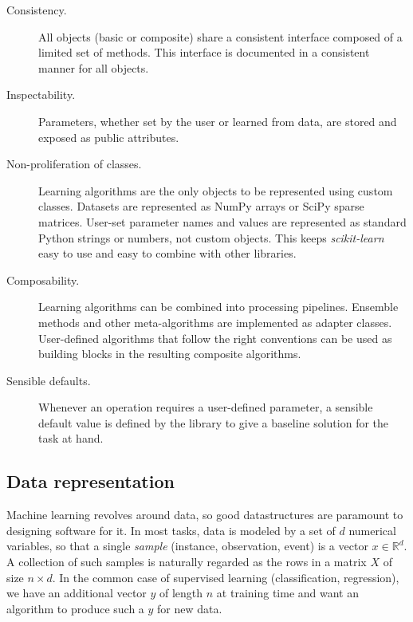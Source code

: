 \documentclass[twocolumn]{article}
\newcommand{\sklearn}{\textit{scikit-learn}\xspace}
\begin{document}
\begin{description}
  \item[Consistency.]
       All objects (basic or composite) share a consistent interface composed of
       a limited set of methods. This interface is documented in a consistent
       manner for all objects.
  \item[Inspectability.]
       Parameters, whether set by the user or learned from data,
       are stored and exposed as public attributes.
  \item[Non-proliferation of classes.]
       Learning algorithms are the only objects to be represented using custom classes.
       Datasets are represented as NumPy arrays or SciPy sparse matrices.
       User-set parameter names and values are represented as standard
       Python strings or numbers, not custom objects.
       This keeps \sklearn easy to use and easy to combine with other libraries.
  \item[Composability.]
       Learning algorithms can be combined into processing pipelines.
       Ensemble methods and other meta-algorithms
       are implemented as adapter classes.
       User-defined algorithms that follow the right conventions
       can be used as building blocks in the resulting composite algorithms.
  \item[Sensible defaults.]
       Whenever an operation requires a user-defined parameter,
       a sensible default value is defined by the library
       to give a baseline solution for the task at hand.
\end{description}

\subsection{Data representation}
\label{sec:arrays}

Machine learning revolves around data,
so good datastructures are paramount to designing software for it.
In most tasks, data is modeled by a set of $d$ numerical variables,
so that a single \textit{sample} (instance, observation, event)
is a vector $x \in \mathbb{R}^d$.
A collection of such samples is naturally regarded
as the rows in a matrix $X$ of size $n \times d$.
In the common case of supervised learning (classification, regression),
we have an additional vector $y$ of length $n$ at training time
and want an algorithm to produce such a $y$ for new data.
\end{document}
